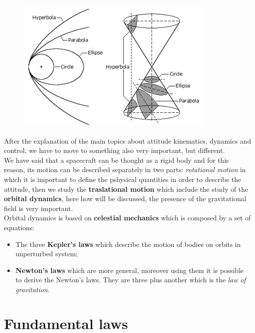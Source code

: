 \begin{figure}[h]
    \centering
    \includegraphics[scale=0.7]{AerospaceApplications/images/orb_dyn.png}
\end{figure}

After the explanation of the main topics about attitude kinematics, dynamics and control, we have to move to something also very important, but different.\\ We have said that a spacecraft can be thought as a rigid body and for this reason, its motion can be described separately in two parts: \textit{rotational motion} in which it is important to define the pshysical quantities in order to describe the attitude, then we study the \textbf{traslational motion} which include the study of the \textbf{orbital dynamics}, here how will be discussed, the presence of the gravitational field is very important.\\

Orbital dynamics is based on \textbf{celestial mechanics} which is composed by a set of equations:
\begin{itemize}
    \itemsep0em
    \item The three \textbf{Kepler's laws} which describe the motion of bodies on orbits in unperturbed system; 
    \item \textbf{Newton's laws} which are more general, moreover using them it is possible to derive the Newton's laws. They are three plus another which is the \textit{law of gravitation}.
\end{itemize}

\section{Fundamental laws}
